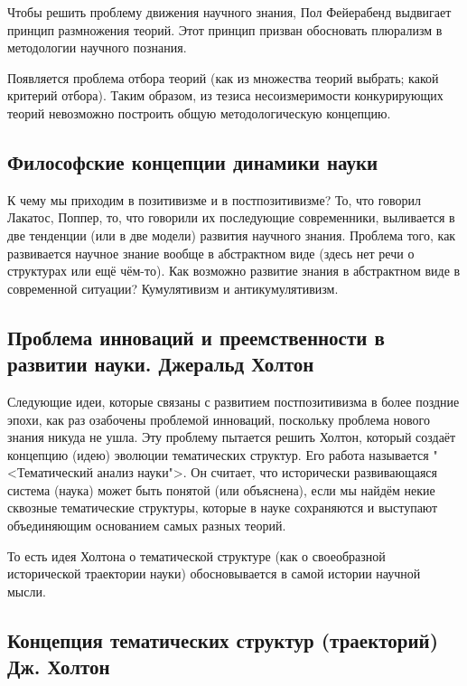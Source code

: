 \documentclass[main.tex]{subfiles}
\begin{document}

Чтобы решить проблему движения научного знания, Пол Фейерабенд выдвигает принцип размножения теорий.
Этот принцип призван обосновать плюрализм в методологии научного познания.

Появляется проблема отбора теорий (как из множества теорий выбрать; какой критерий отбора).
Таким образом, из тезиса несоизмеримости конкурирующих теорий невозможно построить общую методологическую концепцию.

\subsection{Философские концепции динамики науки}


К чему мы приходим в позитивизме и в постпозитивизме?
То, что говорил Лакатос, Поппер, то, что говорили их последующие современники, выливается в две тенденции (или в две модели) развития научного знания.
Проблема того, как развивается научное знание вообще в абстрактном виде (здесь нет речи о структурах или ещё чём-то).
Как возможно развитие знания в абстрактном виде в современной ситуации?
Кумулятивизм и антикумулятивизм.

\subsection{Проблема инноваций и преемственности в развитии науки. Джеральд Холтон}


Следующие идеи, которые связаны с развитием постпозитивизма в более поздние эпохи, как раз озабочены проблемой инноваций, поскольку проблема нового знания никуда не ушла.
Эту проблему пытается решить Холтон, который создаёт концепцию (идею) эволюции тематических структур.
Его работа называется "<Тематический анализ науки">.
Он считает, что исторически развивающаяся система (наука) может быть понятой (или объяснена), если мы найдём некие сквозные тематические структуры, которые в науке сохраняются и выступают объединяющим основанием самых разных теорий.

То есть идея Холтона о тематической структуре (как о своеобразной исторической траектории науки) обосновывается в самой истории научной мысли.

\subsection{Концепция тематических структур (траекторий) Дж. Холтон}
\end{document}
